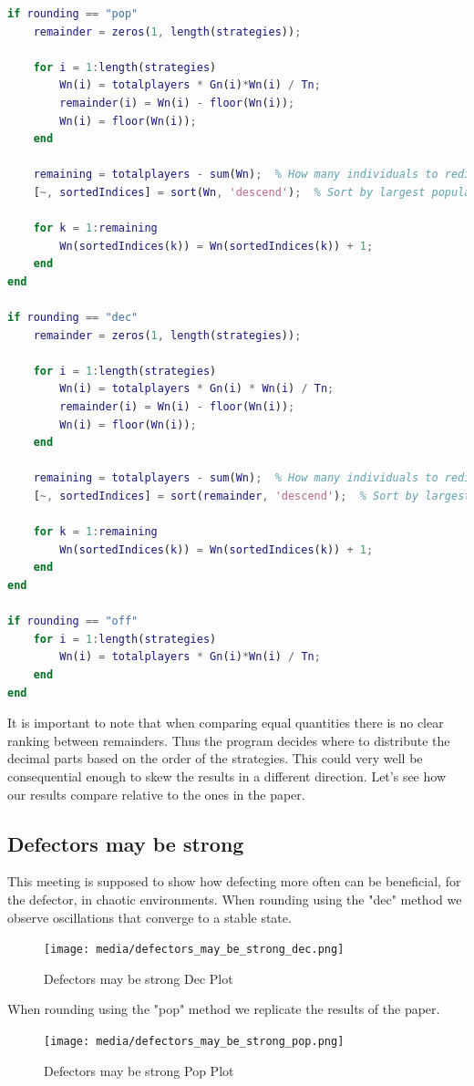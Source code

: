 \documentclass[12pt]{article}
\begin{document}
\begin{lstlisting}[language=Matlab, caption={Full Rounding Logic Implementation}]
%%%%%%%% DECIMAL REDISTRIBUTION %%%%%%%%%%%%%
if rounding == "pop"
    remainder = zeros(1, length(strategies));

    for i = 1:length(strategies)
        Wn(i) = totalplayers * Gn(i)*Wn(i) / Tn;
        remainder(i) = Wn(i) - floor(Wn(i));
        Wn(i) = floor(Wn(i));
    end

    remaining = totalplayers - sum(Wn);  % How many individuals to redistribute
    [~, sortedIndices] = sort(Wn, 'descend');  % Sort by largest populations

    for k = 1:remaining
        Wn(sortedIndices(k)) = Wn(sortedIndices(k)) + 1;
    end
end

if rounding == "dec"
    remainder = zeros(1, length(strategies));

    for i = 1:length(strategies)
        Wn(i) = totalplayers * Gn(i) * Wn(i) / Tn;
        remainder(i) = Wn(i) - floor(Wn(i));
        Wn(i) = floor(Wn(i));
    end

    remaining = totalplayers - sum(Wn);  % How many individuals to redistribute
    [~, sortedIndices] = sort(remainder, 'descend');  % Sort by largest decimals

    for k = 1:remaining
        Wn(sortedIndices(k)) = Wn(sortedIndices(k)) + 1;
    end
end            

if rounding == "off"
    for i = 1:length(strategies)
        Wn(i) = totalplayers * Gn(i)*Wn(i) / Tn;
    end
end
\end{lstlisting}
It is important to note that when comparing equal quantities there is no clear ranking between remainders. Thus the program decides where to distribute the decimal parts based on the order of the strategies. This could very well be consequential enough to skew the results in a different direction. Let's see how our results compare relative to the ones in the paper.
\newpage
\subsection{Defectors may be strong}
This meeting is supposed to show how defecting more often can be beneficial, for the defector, in chaotic environments. When rounding using the "dec" method we observe oscillations that converge to a stable state. 
\begin{figure}[H]
    \centering
    \texttt{[image: media/defectors\_may\_be\_strong\_dec.png]}
    \caption{Defectors may be strong Dec Plot}
\end{figure}
When rounding using the "pop" method we replicate the results of the paper.
\begin{figure}[H]
    \centering
    \texttt{[image: media/defectors\_may\_be\_strong\_pop.png]}
    \caption{Defectors may be strong Pop Plot}
\end{figure}
\end{document}

